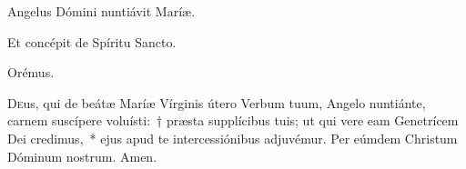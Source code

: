 
\vv Angelus Dómini nuntiávit Maríæ.

\rr Et concépit de Spíritu San\-cto.

Orémus.

\lettrine{D}{e}us, qui de beátæ Maríæ Vírginis útero Verbum tuum, Angelo nuntiánte, carnem suscípere voluísti:~† præsta supplícibus tuis; ut qui vere eam Genetrícem Dei credimus,~* ejus apud te intercessiónibus adjuvémur. Per eúmdem Christum Dóminum nostrum. \rr Amen.